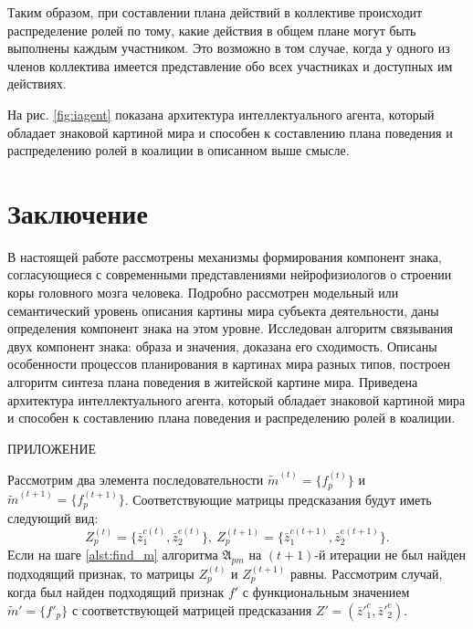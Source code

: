 \documentclass[a4paper, 12pt]{article}
\numberwithin{equation}{section}
\begin{document}
	Таким образом, при составлении плана действий в коллективе происходит распределение ролей по тому, какие действия в общем плане могут быть выполнены каждым участником. Это возможно в том случае, когда у одного из членов коллектива имеется представление обо всех участниках и доступных им действиях.
	
	На рис. \ref{fig:iagent} показана архитектура интеллектуального агента, который обладает знаковой картиной мира и способен к составлению плана поведения и распределению ролей в коалиции в описанном выше смысле.

	\section*{\indent Заключение} В настоящей работе рассмотрены механизмы формирования компонент знака, согласующиеся с современными представлениями нейрофизиологов о строении коры головного мозга человека. Подробно рассмотрен модельный или семантический уровень описания картины мира субъекта деятельности, даны определения компонент знака на этом уровне. Исследован алгоритм связывания двух компонент знака: образа и значения, доказана его сходимость. Описаны особенности процессов планирования в картинах мира разных типов, построен алгоритм синтеза плана поведения в житейской картине мира. Приведена архитектура интеллектуального агента, который обладает знаковой картиной мира и способен к составлению плана поведения и распределению ролей в коалиции.

	\newpage
	{\normalfont\flushright\MakeUppercase{Приложение}\\}
	
	 Рассмотрим два элемента последовательности $\tilde m^{(t)}=\{f_p^{(t)}\}$ и $\tilde m^{(t+1)}=\{f_p^{(t+1)}\}$. Соответствующие матрицы предсказания будут иметь следующий вид:
		\begin{equation*}
		Z_p^{(t)}=\{\bar z_1^{c(t)},\bar z_2^{e(t)}\},\ Z_p^{(t+1)}=\{\bar z_1^{c(t+1)},\bar z_2^{e(t+1)}\}.
		\end{equation*}
		Если на шаге \ref{alst:find_m} алгоритма $\mathfrak A_{pm}$ на $(t+1)$-й итерации не был найден подходящий признак, то матрицы $Z_p^{(t)}$ и $Z_p^{(t+1)}$ равны. Рассмотрим случай, когда был найден подходящий признак $f'$ с функциональным значением $\tilde m'=\{f'_p\}$ с соответствующей матрицей предсказания $Z'=(\bar z'^c_1,\bar z'^e_2)$.
		
\end{document}

